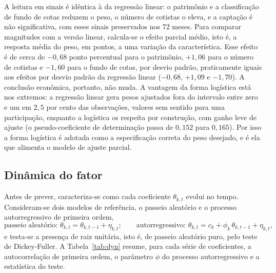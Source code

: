 \documentclass[12pt,a4paper]{article}
\begin{document}
A leitura em sinais é idêntica à da regressão linear: o patrimônio e a classificação de fundo de
cotas reduzem o peso, o número de cotistas o eleva, e a captação é não significativa, com esses
sinais preservados nos 72 meses. Para comparar magnitudes com a versão linear, calcula-se o efeito
parcial médio, isto é, a resposta média do peso, em pontos, a uma variação da característica. Esse
efeito é de cerca de $-0{,}68$ ponto percentual para o patrimônio, $+1{,}06$ para o número de
cotistas e $-1{,}60$ para o fundo de cotas, por desvio padrão, praticamente iguais aos efeitos por
desvio padrão da regressão linear ($-0{,}68$, $+1{,}09$ e $-1{,}70$). A conclusão econômica,
portanto, não muda. A vantagem da forma logística está nos extremos: a regressão linear gera pesos
ajustados fora do intervalo entre zero e um em $2{,}5$ por cento das observações, valores sem
sentido para uma participação, enquanto a logística os respeita por construção, com ganho leve de
ajuste (o pseudo-coeficiente de determinação passa de $0{,}152$ para $0{,}165$). Por isso a forma
logística é adotada como a especificação correta do peso desejado, e é ela que alimenta o modelo de
ajuste parcial.

\subsection{Dinâmica do fator}

Antes de prever, caracteriza-se como cada coeficiente $\theta_{k,t}$ evolui no tempo. Consideram-se
dois modelos de referência, o passeio aleatório e o processo autorregressivo de primeira ordem,
\begin{equation}
\text{passeio aleatório: } \theta_{k,t} = \theta_{k,t-1} + \eta_{k,t};
\qquad
\text{autorregressivo: } \theta_{k,t} = c_k + \phi_k\,\theta_{k,t-1} + \eta_{k,t},
\label{eq:dyn}
\end{equation}
e testa-se a presença de raiz unitária, isto é, de passeio aleatório puro, pelo teste de
Dickey-Fuller. A Tabela~\ref{tab:dyn} resume, para cada série de coeficientes, a autocorrelação de
primeira ordem, o parâmetro $\phi$ do processo autorregressivo e a estatística do teste.
\end{document}
